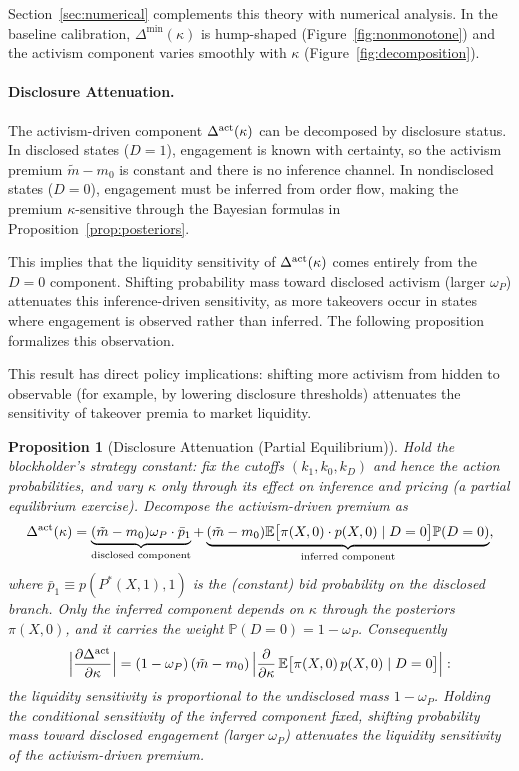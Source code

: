\documentclass[11pt]{article}
\newtheorem{proposition}{Proposition}
\newcommand{\E}{\mathbb{E}}
\newcommand{\PP}{\mathbb{P}}
\newcommand{\1}{\mathbf{1}}
\begin{document}
Section~\ref{sec:numerical} complements this theory with numerical analysis. In the baseline calibration, $\Delta^{\min}(\kappa)$ is hump-shaped (Figure~\ref{fig:nonmonotone}) and the activism component varies smoothly with $\kappa$ (Figure~\ref{fig:decomposition}).

%
\paragraph{Disclosure Attenuation.}
%

The activism-driven component $\Delta^{\textup{act}}(\kappa)$ can be decomposed by disclosure status. In disclosed states ($D=1$), engagement is known with certainty, so the activism premium $\tilde{m}-m_0$ is constant and there is no inference channel. In nondisclosed states ($D=0$), engagement must be inferred from order flow, making the premium $\kappa$-sensitive through the Bayesian formulas in Proposition~\ref{prop:posteriors}.

This implies that the liquidity sensitivity of $\Delta^{\textup{act}}(\kappa)$ comes entirely from the $D=0$ component. Shifting probability mass toward disclosed activism (larger $\omega_P$) attenuates this inference-driven sensitivity, as more takeovers occur in states where engagement is observed rather than inferred. The following proposition formalizes this observation.

This result has direct policy implications: shifting more activism from hidden to observable (for example, by lowering disclosure thresholds) attenuates the sensitivity of takeover premia to market liquidity.

\begin{proposition}[Disclosure Attenuation (Partial Equilibrium)]
\label{prop:disclosure-attenuation}
Hold the blockholder's strategy constant: fix the cutoffs $(k_1,k_0,k_D)$ and hence the action probabilities, and vary $\kappa$ only through its effect on inference and pricing (a partial equilibrium exercise). Decompose the activism-driven premium as
\[
\Delta^{\textup{act}}(\kappa) = \underbrace{(\tilde{m}-m_0)\omega_P \cdot \bar{p}_1}_{\text{disclosed component}} + \underbrace{(\tilde{m}-m_0)\E\big[\pi(X,0)\cdot p(X,0) \mid D=0\big]\PP(D=0)}_{\text{inferred component}},
\]
where $\bar{p}_1 \equiv p(P^*(X,1),1)$ is the (constant) bid probability on the disclosed branch. Only the inferred component depends on $\kappa$ through the posteriors $\pi(X,0)$, and it carries the weight $\PP(D=0)=1-\omega_P$. Consequently
\[
\Bigl|\frac{\partial \Delta^{\textup{act}}}{\partial\kappa}\Bigr|
=(1-\omega_P)\,(\tilde m-m_0)\,
 \Bigl|\frac{\partial}{\partial\kappa}\,
 \E\bigl[\pi(X,0)\,p(X,0)\mid D=0\bigr]\Bigr| :
\]
the liquidity sensitivity is proportional to the undisclosed mass $1-\omega_P$. \emph{Holding the conditional sensitivity of the inferred component fixed}, shifting probability mass toward disclosed engagement (larger $\omega_P$) attenuates the liquidity sensitivity of the activism-driven premium.
\end{proposition}
\end{document}
